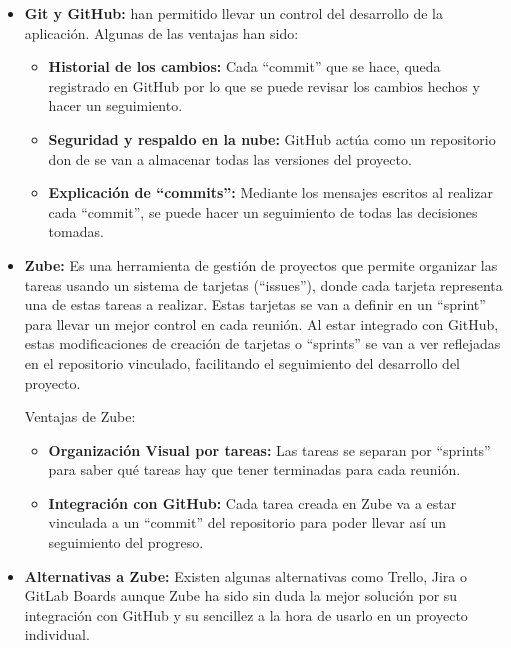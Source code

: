 \begin{itemize}
    \item \textbf{Git y GitHub:} han permitido llevar un control del desarrollo de la aplicación. Algunas de las ventajas han sido:
    \begin{itemize}
        \item \textbf{Historial de los cambios:} Cada ``commit'' que se hace, queda registrado en GitHub por lo que se puede revisar los cambios hechos y hacer un seguimiento.
        \item \textbf{Seguridad y respaldo en la nube:} GitHub actúa como un repositorio don de se van a almacenar todas las versiones del proyecto.
        \item \textbf{Explicación de ``commits'':} Mediante los mensajes escritos al realizar cada ``commit'', se puede hacer un seguimiento de todas las decisiones tomadas.
    \end{itemize}

    \item \textbf{Zube:} Es una herramienta de gestión de proyectos que permite organizar las tareas usando un sistema de tarjetas (``issues''), donde cada tarjeta representa una de estas tareas a realizar. Estas tarjetas se van a definir en un ``sprint'' para llevar un mejor control en cada reunión. Al estar integrado con GitHub, estas modificaciones de creación de tarjetas o ``sprints'' se van a ver reflejadas en el repositorio vinculado, facilitando el seguimiento del desarrollo del proyecto. 
    
    Ventajas de Zube:
    \begin{itemize}
        \item \textbf{Organización Visual por tareas:} Las tareas se separan por ``sprints'' para saber qué tareas hay que tener terminadas para cada reunión.
        \item \textbf{Integración con GitHub:} Cada tarea creada en Zube va a estar vinculada a un ``commit'' del repositorio para poder llevar así un seguimiento del progreso.
    \end{itemize}

    \item \textbf{Alternativas a Zube:} Existen algunas alternativas como Trello, Jira o GitLab Boards aunque Zube ha sido sin duda la mejor solución por su integración con GitHub y su sencillez a la hora de usarlo en un proyecto individual.
\end{itemize}
